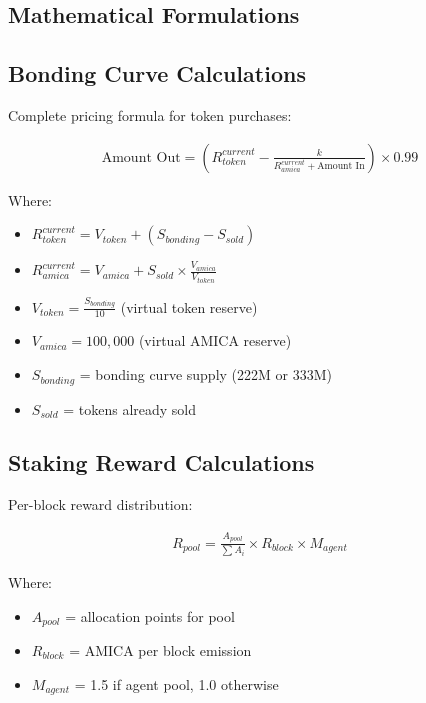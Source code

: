 \documentclass{article}
\begin{document}
\begin{appendices}

\section{Mathematical Formulations}

\subsection{Bonding Curve Calculations}

Complete pricing formula for token purchases:

\begin{align}
\text{Amount Out} = \left(R_{token}^{current} - \frac{k}{R_{amica}^{current} + \text{Amount In}}\right) \times 0.99
\end{align}

Where:
\begin{itemize}
    \item $R_{token}^{current} = V_{token} + (S_{bonding} - S_{sold})$
    \item $R_{amica}^{current} = V_{amica} + S_{sold} \times \frac{V_{amica}}{V_{token}}$
    \item $V_{token} = \frac{S_{bonding}}{10}$ (virtual token reserve)
    \item $V_{amica} = 100,000$ (virtual AMICA reserve)
    \item $S_{bonding}$ = bonding curve supply (222M or 333M)
    \item $S_{sold}$ = tokens already sold
\end{itemize}

\subsection{Staking Reward Calculations}

Per-block reward distribution:

\begin{align}
R_{pool} = \frac{A_{pool}}{\sum A_i} \times R_{block} \times M_{agent}
\end{align}

Where:
\begin{itemize}
    \item $A_{pool}$ = allocation points for pool
    \item $R_{block}$ = AMICA per block emission
    \item $M_{agent}$ = 1.5 if agent pool, 1.0 otherwise
\end{itemize}


\end{appendices}
\end{document}
